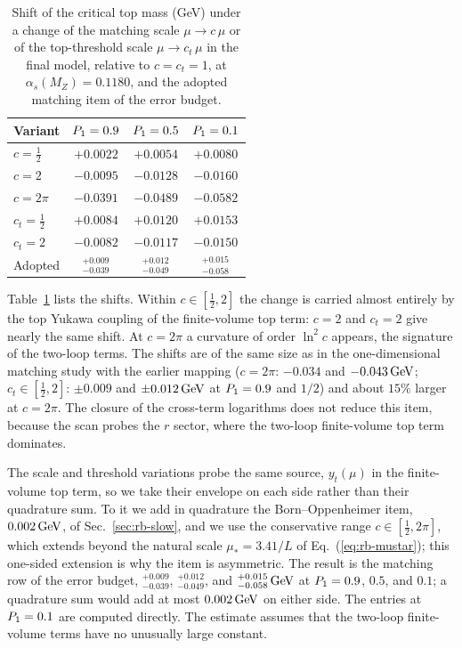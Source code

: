 \begin{table}[t]
\centering
\caption{Shift of the critical top mass (GeV) under a change of the matching scale $\mu\to c\,\mu$ or of the top-threshold scale $\mu\to c_t\,\mu$ in the final model, relative to $c=c_t=1$, at $\alpha_s(M_Z)=0.1180$, and the adopted matching item of the error budget.} %
\label{tab:rb-muscan}
\begin{tabular}{lccc}
\toprule
Variant & $P_1=0.9$ & $P_1=0.5$ & $P_1=0.1$ \\
\midrule
$c=\frac12$ & $+0.0022$ & $+0.0054$ & $+0.0080$ \\ %
$c=2$ & $-0.0095$ & $-0.0128$ & $-0.0160$ \\ %
$c=2\pi$ & $-0.0391$ & $-0.0489$ & $-0.0582$ \\ %
$c_t=\frac12$ & $+0.0084$ & $+0.0120$ & $+0.0153$ \\ %
$c_t=2$ & $-0.0082$ & $-0.0117$ & $-0.0150$ \\ %
\midrule
Adopted & $^{+0.009}_{-0.039}$ & $^{+0.012}_{-0.049}$ & $^{+0.015}_{-0.058}$ \\ %
\bottomrule
\end{tabular}
\end{table}

Table~\ref{tab:rb-muscan} lists the shifts.
Within $c\in[\frac12,2]$ the change is carried almost entirely by the top Yukawa coupling of the finite-volume top term: $c=2$ and $c_t=2$ give nearly the same shift.
At $c=2\pi$ a curvature of order $\ln^2c$ appears, the signature of the two-loop terms.
The shifts are of the same size as in the one-dimensional matching study with the earlier mapping ($c=2\pi$: $-0.034$ and $-0.043\,\mathrm{GeV}$; $c_t\in[\frac12,2]$: $\pm0.009$ and $\pm0.012\,\mathrm{GeV}$ at $P_1=0.9$ and $1/2$) and about $15\%$ larger at $c=2\pi$. %
The closure of the cross-term logarithms does not reduce this item, because the scan probes the $r$ sector, where the two-loop finite-volume top term dominates.

The scale and threshold variations probe the same source, $y_t(\mu)$ in the finite-volume top term, so we take their envelope on each side rather than their quadrature sum.
To it we add in quadrature the Born--Oppenheimer item, $0.002\,\mathrm{GeV}$, of Sec.~\ref{sec:rb-slow}, and we use the conservative range $c\in[\frac12,2\pi]$, which extends beyond the natural scale $\mu_*=3.41/L$ of Eq.~(\ref{eq:rb-mustar}); this one-sided extension is why the item is asymmetric. %
The result is the matching row of the error budget, $^{+0.009}_{-0.039}$, $^{+0.012}_{-0.049}$, and $^{+0.015}_{-0.058}\,\mathrm{GeV}$ at $P_1=0.9$, $0.5$, and $0.1$; a quadrature sum would add at most $0.002\,\mathrm{GeV}$ on either side. %
The entries at $P_1=0.1$ are computed directly.
The estimate assumes that the two-loop finite-volume terms have no unusually large constant.
